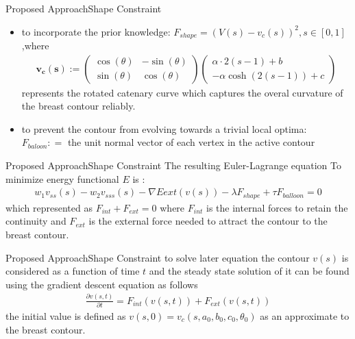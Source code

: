 \documentclass[10pt]{beamer}
\begin{document}
\begin{frame}{Proposed Approach}{Shape Constraint} 
\begin{itemize}
	\item to incorporate the prior knowledge:
	$F_{shape}=(V(s)-v_{c}(s))^2 ,s \in [0,1]$ ,where
	\begin{gather}
	\mathbf{v_{c}(s)} :=
	\begin{pmatrix}
	\cos(\theta) & -\sin(\theta) \\
	\sin(\theta) & \cos(\theta)
	\end{pmatrix}
	\begin{pmatrix}
	\alpha \cdot 2(s-1)+b \\
	-\alpha \cosh(2(s-1))+c
	\end{pmatrix} 
	\end{gather}
	represents the rotated catenary curve which captures the overal curvature of the breast contour reliably.
	\item to prevent the contour from evolving towards a trivial local optima:\\
	$F_{baloon}\mathrel{\mathop:}=$  the unit normal vector of each vertex in the active contour
		  
\end{itemize}
\end{frame}

\begin{frame}{Proposed Approach}{Shape Constraint} 
The resulting Euler-Lagrange equation To minimize energy functional $E$ is :
\begin{gather}
w_{1}v_{ss}(s)-w_{2}v_{sss}(s)-\nabla E{ext}(v(s))-\lambda F_{shape}+\tau F_{balloon} = 0 
\end{gather}
which represented as $F_{int}+F_{ext}=0$ where $F_{int}$ is the internal forces to retain the continuity and $F_{ext}$ is the external force needed to attract the contour to the breast contour.
\end{frame}

\begin{frame}{Proposed Approach}{Shape Constraint}
to solve later equation the contour $v(s)$ is considered as a function of time $t$ and the steady state solution of it can be found using the gradient descent equation as follows
\begin{gather}
\frac{\partial v(s,t)}{\partial t} = F_{int}(v(s,t)) + F_{ext}(v(s,t)) 
\end{gather}
the initial value is defined as $v(s,0)=v_{c}(s,a_{0},b_{0},c_{0},\theta_{0})$ as an approximate to the breast contour.
\end{frame}
\end{document}
